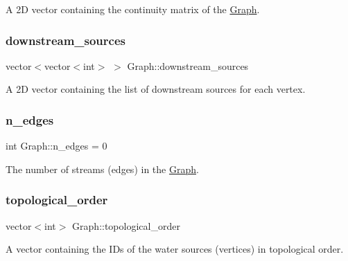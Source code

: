A 2D vector containing the continuity matrix of the \mbox{\hyperlink{classGraph}{Graph}}. 

\mbox{\label{classGraph_a1c89a48555f165ef3e80b85ca5655bea}} 
\subsubsection{\texorpdfstring{downstream\+\_\+sources}{downstream\_sources}}
{\footnotesize\ttfamily vector$<$vector$<$int$>$ $>$ Graph\+::downstream\+\_\+sources\hspace{0.3cm}{\ttfamily [protected]}}



A 2D vector containing the list of downstream sources for each vertex. 

\mbox{\label{classGraph_a9a7e34b482b020fa136fc8e0fa2d0030}} 
\subsubsection{\texorpdfstring{n\+\_\+edges}{n\_edges}}
{\footnotesize\ttfamily int Graph\+::n\+\_\+edges = 0\hspace{0.3cm}{\ttfamily [protected]}}



The number of streams (edges) in the \mbox{\hyperlink{classGraph}{Graph}}. 

\mbox{\label{classGraph_ad18af6207537a43b3cf53b56acaf92fd}} 
\subsubsection{\texorpdfstring{topological\+\_\+order}{topological\_order}}
{\footnotesize\ttfamily vector$<$int$>$ Graph\+::topological\+\_\+order\hspace{0.3cm}{\ttfamily [protected]}}



A vector containing the I\+Ds of the water sources (vertices) in topological order. 

